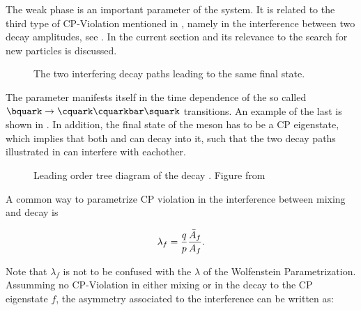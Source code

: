 The weak phase \phis is an important parameter of the \BBbarSyst system. It is related to the third
type of CP-Violation mentioned in , namely in the interference between
two decay amplitudes, see . In the current section \phis and its relevance to
the search for new particles is discussed.

\newcommand{\ffig}{f}
\newcommand{\phimixfig}{\phi_\text{mix}}
\newcommand{\phifig}{\phi_\text{dec}}
\newcommand{\phibarfig}{\kern 0.15em \overline{\kern -0.15em \phi_\text{dec} \kern -0.60em} \kern 0.60em}
\begin{figure}[h]
  \centering
  \resizebox{0.4\textwidth}{!}{}
  \caption{The two interfering decay paths leading to the same final state.}
  \label{interference}
\end{figure}

The parameter \phis manifests itself in the time dependence of the so called $\bquark \rightarrow \cquark\cquarkbar\squark $ transitions.
An example of the last is shown in . In addition, the final state of the \Bs meson has to be
a CP eigenstate, which implies that both \Bs and \Bsb can decay into it, such that the two decay paths
illustrated in  can interfere with eachother.

\begin{figure}[!h]
  \centering
  {\sffamily }
  \caption{Leading order tree diagram of the decay \BsJpsiPhi. Figure from~\cite{jeroenThesis}}
  \label{bs2jpsiphi}
\end{figure}

A common way to parametrize CP violation in the interference between mixing and decay is

\begin{equation}
  \centering
  \lambda_{f} = \frac{q}{p} \frac{\bar{A}_f}{A_f}. %
\label{lambda_cpv}
\end{equation}

\noindent Note that $\lambda_f$ is not to be confused with the $\lambda$ of the Wolfenstein Parametrization.
Assumming no CP-Violation in either \BBbarSyst mixing or in the decay to the CP eigenstate $f$, the asymmetry
associated to the interference can be written as:



